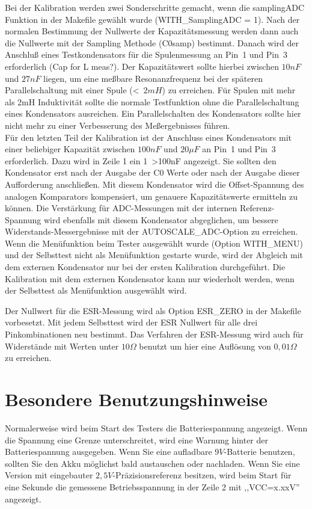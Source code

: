 Bei der Kalibration werden zwei Sonderschritte gemacht, wenn die samplingADC Funktion in der Makefile gewählt wurde (WITH\_SamplingADC = 1).
Nach der normalen Bestimmung der Nullwerte der Kapazitätsmessung werden dann auch die Nullwerte mit
der Sampling Methode (C0samp) bestimmt. Danach wird der Anschluß eines Testkondensators für die
Spulenmessung an Pin~1 und Pin~3 erforderlich (Cap for L meas?).
Der Kapazitätswert sollte hierbei zwischen \(10nF\) und \(27nF\) liegen,
um eine meßbare Resonanzfrequenz bei der späteren Parallelschaltung mit einer Spule (\textless~\(2mH\)) zu erreichen.
Für Spulen mit mehr als 2mH Induktivität sollte die normale Testfunktion ohne die Parallelschaltung eines
Kondensators ausreichen. Ein Parallelschalten des Kondensators sollte hier nicht mehr 
zu einer Verbesserung des Meßergebnisses führen.\\

Für den letzten Teil der Kalibration ist der Anschluss eines Kondensators 
mit einer beliebiger Kapazität zwischen \(100nF\) und \(20\mu F\) an Pin~1 und Pin~3 erforderlich.
Dazu wird in Zeile 1 ein \mbox{1 \textgreater 100nF} angezeigt.
Sie sollten den Kondensator erst nach der Ausgabe der C0 Werte oder nach der Ausgabe dieser Aufforderung anschließen.
Mit diesem Kondensator wird die Offset-Spannung des analogen Komparators kompensiert,
um genauere Kapazitätswerte ermitteln zu können.
Die Verstärkung für ADC-Messungen mit der internen Referenz-Spannung wird ebenfalls mit diesem Kondensator abgeglichen, um
bessere Widerstands-Messergebnisse mit der AUTOSCALE\_ADC-Option zu erreichen.
Wenn die Menüfunktion beim Tester ausgewählt wurde (Option WITH\_MENU) und der Selbsttest
nicht als Menüfunktion gestarte wurde, wird der Abgleich mit dem externen Kondensator nur bei
der ersten Kalibration durchgeführt.
Die Kalibration mit dem externen Kondensator kann nur wiederholt werden, wenn der Selbsttest
als Menüfunktion ausgewählt wird.

Der Nullwert für die ESR-Messung wird als Option ESR\_ZERO in der Makefile vorbesetzt.
Mit jedem Selbsttest wird der ESR Nullwert für alle drei Pinkombinationen neu bestimmt.
Das Verfahren der ESR-Messung wird auch für Widerstände mit Werten unter \(10\Omega\) benutzt um
hier eine Auflösung von \(0,01\Omega\) zu erreichen.

\section{Besondere Benutzungshinweise}
Normalerweise wird beim Start des Testers die Batteriespannung angezeigt. Wenn die Spannung eine Grenze unterschreitet, 
wird eine Warnung hinter der Batteriespannung ausgegeben. Wenn Sie eine aufladbare \(9V\)-Batterie benutzen, sollten Sie
den Akku möglichst bald austauschen oder nachladen.
Wenn Sie eine Version mit eingebauter \(2,5V\)-Präzisionsreferenz besitzen, wird beim Start für eine Sekunde die
gemessene Betriebsspannung in der Zeile 2 mit ,,VCC=x.xxV'' angezeigt.

